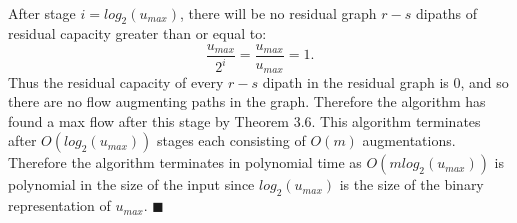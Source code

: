 \documentclass[letterpaper,12pt,oneside,onecolumn]{article}
\begin{document}
\paragraph{}
After stage $i = log_2(u_{max})$, there will be no residual graph $r-s$ dipaths of residual capacity greater than or equal to:
$$
\frac{u_{max}}{2^i} = \frac{u_{max}}{u_{max}} = 1.
$$
Thus the residual capacity of every $r-s$ dipath in the residual graph is $0$, and so there are no flow augmenting paths in the graph. Therefore the algorithm has found a max flow after this stage by Theorem $3.6$. This algorithm terminates after $O(log_2(u_{max}))$ stages each consisting of $O(m)$ augmentations. Therefore the algorithm terminates in polynomial time as $O(mlog_2(u_{max}))$ is polynomial in the size of the input since $log_2(u_{max})$ is the size of the binary representation of $u_{max}$. $\blacksquare$
\end{document}
